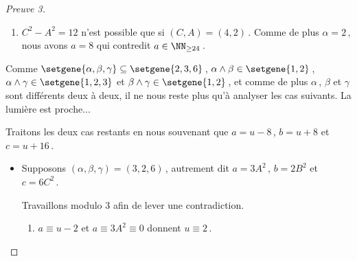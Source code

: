 \begin{proof}[Preuve 3]
\begin{itemize}
\begin{enumerate}
			
			\item $C^2 - A^2 = 12$ n'est possible que si $(C, A) = (4, 2)$\,.
			Comme de plus $\alpha = 2$\,, nous avons $a = 8$ qui contredit $a \in \NN_{\geq 24}$\,.
		\end{enumerate}
	\end{itemize}


	\medskip
	
	Comme
	$\setgene{\alpha, \beta, \gamma} \subseteq \setgene{2, 3, 6}$\,,
	$\alpha \wedge \beta \in \setgene{1, 2}$\,,
	$\alpha \wedge \gamma \in \setgene{1, 2, 3}$ et
	$\beta \wedge \gamma \in \setgene{1, 2}$\,,
	et comme de plus $\alpha$\,, $\beta$ et $\gamma$ sont différents deux à deux, il ne nous reste plus qu'à analyser les cas suivants.
	La lumière est proche...

	\begin{center}
	\end{center}


	Traitons les deux cas restants en nous souvenant que $a = u - 8$\,, $b = u + 8$ et $c = u + 16$\,.
	
	\begin{itemize}
		\item Supposons $(\alpha, \beta, \gamma) = (3, 2, 6)$\,, 
		autrement dit 
		$a = 3 A^2$\,, $b = 2 B^2$ et $c = 6 C^2$\,.
		
		\smallskip
		\noindent
		Travaillons modulo $3$ afin de lever une contradiction.
		\begin{enumerate}			
			\item $a \equiv u - 2$ et $a \equiv 3 A^2 \equiv 0$ donnent $u \equiv 2$\,.
			

\end{enumerate}
\end{itemize}
\end{proof}
